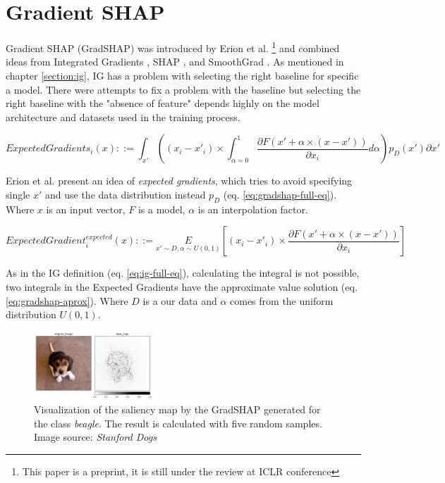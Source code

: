 \section{Gradient SHAP}

Gradient SHAP (GradSHAP) was introduced by Erion et al. \cite{erion2019learning}\footnote{This paper is a preprint, it is still under the review at ICLR conference} and combined ideas from Integrated Gradients \cite{sundararajan2017axiomatic}, SHAP \cite{lundberg2017unified}, and SmoothGrad \cite{smilkov2017smoothgrad}. As mentioned in chapter \ref{section:ig}, IG has a problem with selecting the right baseline for specific a model. There were attempts to fix a problem with the baseline \cite{smilkov2017smoothgrad}\cite{fong2017interpretable}\cite{sturmfels2020visualizing} but selecting the right baseline with the "absence of feature" depends highly on the model architecture and datasets used in the training process.


\begin{equation}
    ExpectedGradients_{i}(x) ::= \int_{x'}\left( (x_{i} - x'_{i})\times\int_{\alpha=0}^1\frac{\partial F(x'+\alpha \times (x - x'))}{\partial x_i}{d\alpha} \right)p_D(x')\partial x'
    \label{eq:gradshap-full-eq}
\end{equation}

Erion et al. present an idea of \textit{expected gradients}, which tries to avoid specifying single $x'$ and use the data distribution instead $p_D$ (eq. \ref{eq:gradshap-full-eq}). Where $x$ is an input vector, $F$ is a model, $\alpha$ is an interpolation factor.


\begin{equation}
    ExpectedGradient^{expected}_{i}(x) ::= \underset{x' \sim D, \alpha \sim U(0,1)}{E} \left[(x_{i}-x'_{i})\times\frac{\partial F(x'+\alpha \times (x - x'))}{\partial x_i} \right]
    \label{eq:gradshap-aprox}
\end{equation}

As in the IG definition (eq. \ref{eq:ig-full-eq}), calculating the integral is not possible, two integrals in the Expected Gradients have the approximate value solution (eq. \ref{eq:gradshap-aprox}). Where $D$ is a our data and $\alpha$ comes from the uniform distribution $U(0,1)$.

\begin{figure}
  \includegraphics[width=0.40\textwidth]{methods/images/gradshap-beagle.png}
  \caption{Visualization of the saliency map by the GradSHAP generated for the class \textit{beagle}. The result is calculated with five random samples. Image source: \textit{Stanford Dogs} \cite{stanford-dogs}}\label{fig:gradshap-beagle}
  \vspace{1mm}
\end{figure}

